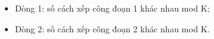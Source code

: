 \begin{itemize}
	\item     Dòng 1: số cách xếp công đoạn 1 khác nhau mod K;   
	\item     Dòng 2: số cách xếp công đoạn 2 khác nhau mod K.   
\end{itemize}